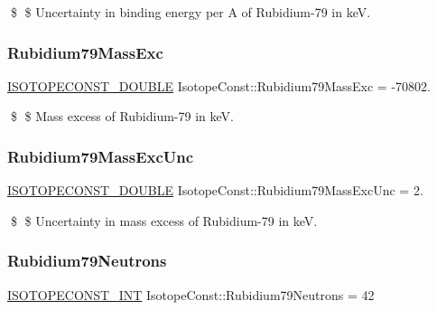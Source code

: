 \$ \$ Uncertainty in binding energy per A of Rubidium-\/79 in keV. \mbox{\label{group___isotope_const-_rubidium-_rb79_ga61f52b9ae2b86614b2927181d285d306}} 
\subsubsection{\texorpdfstring{Rubidium79\+Mass\+Exc}{Rubidium79MassExc}}
{\footnotesize\ttfamily \mbox{\hyperlink{group___isotope_const-_macros_ga8f45a7272ce02c0b4c65c44636ed719a}{I\+S\+O\+T\+O\+P\+E\+C\+O\+N\+S\+T\+\_\+\+D\+O\+U\+B\+LE}} Isotope\+Const\+::\+Rubidium79\+Mass\+Exc = -\/70802.}

\$ \$ Mass excess of Rubidium-\/79 in keV. \mbox{\label{group___isotope_const-_rubidium-_rb79_gab64926ed83ce7a344f67e7118108f5e8}} 
\subsubsection{\texorpdfstring{Rubidium79\+Mass\+Exc\+Unc}{Rubidium79MassExcUnc}}
{\footnotesize\ttfamily \mbox{\hyperlink{group___isotope_const-_macros_ga8f45a7272ce02c0b4c65c44636ed719a}{I\+S\+O\+T\+O\+P\+E\+C\+O\+N\+S\+T\+\_\+\+D\+O\+U\+B\+LE}} Isotope\+Const\+::\+Rubidium79\+Mass\+Exc\+Unc = 2.}

\$ \$ Uncertainty in mass excess of Rubidium-\/79 in keV. \mbox{\label{group___isotope_const-_rubidium-_rb79_ga689284c32752f8137b6a7a11098403cf}} 
\subsubsection{\texorpdfstring{Rubidium79\+Neutrons}{Rubidium79Neutrons}}
{\footnotesize\ttfamily \mbox{\hyperlink{group___isotope_const-_macros_ga5f18360b3e99483a35c32d789e62621c}{I\+S\+O\+T\+O\+P\+E\+C\+O\+N\+S\+T\+\_\+\+I\+NT}} Isotope\+Const\+::\+Rubidium79\+Neutrons = 42}

